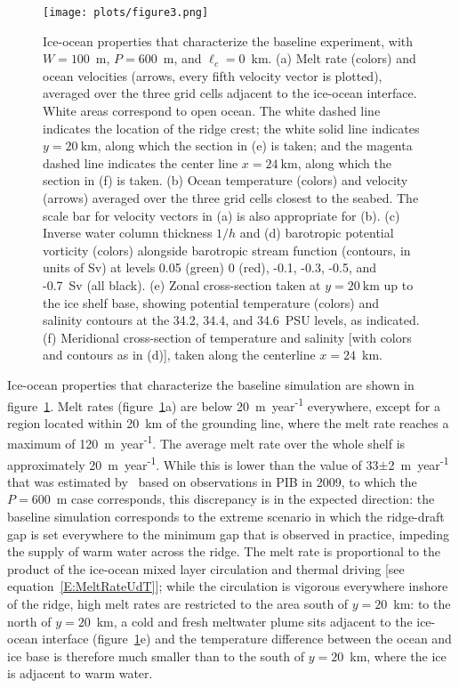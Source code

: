 \documentclass[draft]{agujournal2019}
\begin{document}
\begin{figure}
    \centering
    \texttt{[image: plots/figure3.png]}
    \caption{Ice-ocean properties that characterize the baseline experiment, with $W = 100$~m, $P = 600$~m, and $\ell_c = 0$~km. (a) Melt rate (colors) and ocean velocities (arrows, every fifth velocity vector is plotted), averaged over the three grid cells adjacent to the ice-ocean interface. White areas correspond to open ocean. The white dashed line indicates the location of the ridge crest; the white solid line indicates $y=20~\text{km}$, along which the section in (e) is taken; and the magenta dashed line indicates the center line $x = 24~\text{km}$, along which the section in (f) is taken. (b) Ocean temperature (colors) and velocity (arrows) averaged over the three grid cells closest to the seabed. The scale bar for velocity vectors in (a) is also appropriate for (b). (c) Inverse water column thickness $1/h$  and (d) barotropic potential vorticity (colors) alongside barotropic stream function (contours, in units of Sv) at levels 0.05 (green) 0 (red), -0.1, -0.3, -0.5, and -0.7~Sv (all black). (e) Zonal cross-section taken at $y=20~\text{km}$ up to the ice shelf base, showing potential temperature (colors) and salinity contours at the 34.2, 34.4, and 34.6~PSU levels, as indicated. (f) Meridional cross-section of temperature and salinity [with colors and contours as in (d)], taken along the centerline $x = 24$~km.}
    \label{fig:figure3}
\end{figure}

Ice-ocean properties that characterize the baseline simulation are shown in figure~\ref{fig:figure3}. Melt rates (figure~\ref{fig:figure3}a) are below  20~m~year\textsuperscript{-1} everywhere, except for a region located within 20~km of the grounding line, where the melt rate reaches a maximum of 120~m~year\textsuperscript{-1}. The average melt rate over the whole shelf is approximately 20~m~year\textsuperscript{-1}.  While this is lower than the value of 33$\pm$2~m~year\textsuperscript{-1} that was estimated by~ based on observations in PIB in 2009, to which the $P=600$~m case corresponds, this discrepancy is in the expected direction: the baseline simulation corresponds to the extreme scenario in which the ridge-draft gap is set everywhere to the minimum gap that is observed in practice, impeding the supply of warm water across the ridge. The melt rate is proportional to the product of the ice-ocean mixed layer circulation and thermal driving [see equation~\eqref{E:MeltRateUdT}]; while the circulation is vigorous everywhere inshore of the ridge, high melt rates are restricted to the area south of $y=20$~km: to the north of $y=20$~km, a cold and fresh meltwater plume sits adjacent to the ice-ocean interface (figure~\ref{fig:figure3}e) and the temperature difference between the ocean and ice base is therefore much smaller than to the south of $y=20$~km, where the ice is adjacent to warm water.
\end{document}
